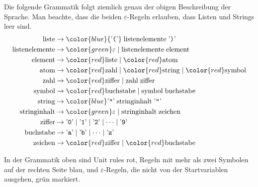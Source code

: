 \begin{loesung}
\begin{teilaufgaben}
\item Die folgende Grammatik folgt ziemlich genau der obigen Beschreibung
der Sprache. Man beachte, dass die beiden $\varepsilon$-Regeln
erlauben, dass Listen und Strings leer sind.
\begin{align*}
\text{liste}&\rightarrow {\color{blue}
{\text{'{\tt (}'}}\;
\text{listenelemente}\;
{\text{'{\tt )}'}}}
\\
\text{listenelemente}&\rightarrow {\color{green}\varepsilon} \mid  \text{listenelemente}\;\text{element}
\\
\text{element}&\rightarrow {\color{red}\text{liste}} \mid  {\color{red}\text{atom}}
\\
\text{atom}&\rightarrow {\color{red}\text{zahl}}\mid {\color{red}\text{string}}\mid {\color{red}\text{symbol}}
\\
\text{zahl}&\rightarrow {\color{red}\text{ziffer}}\mid \text{zahl}\;\text{ziffer}
\\
\text{symbol}&\rightarrow {\color{red}\text{buchstabe}} \mid  \text{symbol}\;\text{buchstabe}
\\
\text{string}&\rightarrow {\color{blue}
\text{'{\tt\textquotedblright}'}\; \text{stringinhalt}\;
\text{'{\tt\textquotedblright}'}}
\\
\text{stringinhalt}&\rightarrow {\color{green}\varepsilon} \mid  \text{stringinhalt}\;\text{zeichen}
\\
\text{ziffer}&\rightarrow
{\text{'{\tt 0}'}} \mid 
{\text{'{\tt 1}'}} \mid 
{\text{'{\tt 2}'}} \mid 
\dots \mid 
{\text{'{\tt 9}'}}
\\
\text{buchstabe}&\rightarrow
{\text{'{\tt a}'}} \mid 
{\text{'{\tt b}'}} \mid 
\dots \mid 
{\text{'{\tt z}'}}
\\
\text{zeichen}&\rightarrow {\color{red}\text{ziffer}}\; |\; {\color{red}\text{buchstabe}}
\end{align*}
\item
In der Grammatik oben sind
Unit rules
{\color{red}
rot},
Regeln mit mehr als zwei Symbolen auf der rechten Seite
{\color{blue}
blau},
und
$\varepsilon$-Regeln, die nicht von der Startvariablen ausgehen,
{\color{green}
grün} markiert.
\qedhere
\end{teilaufgaben}
\end{loesung}

